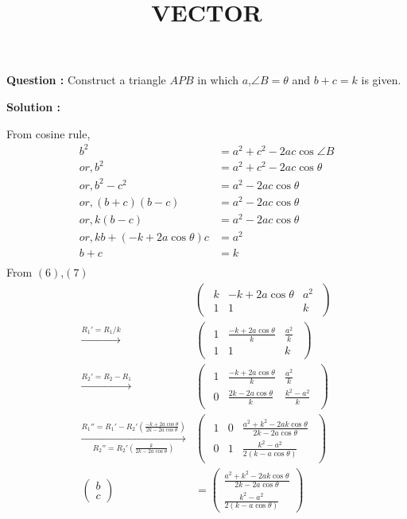 \documentclass[12pt]{article}
\providecommand{\brak}[1]{\ensuremath{\left(#1\right)}}
\begin{document}
\title{\textbf{VECTOR}}
\date{}
\maketitle
\textbf{Question :} Construct a triangle $APB$ in which $a$,$\angle B = \theta$ and $b+c= k$ is given.


\textbf{Solution :}

From cosine rule,
\begin{align}
  b^2&=a^2+c^2-2ac\cos{\angle B} \\
  or,b^2&=a^2+c^2-2ac\cos{\theta}\\
  or,b^2-c^2 &=a^2-2ac\cos{\theta}\\
  or,\brak{b+c}\brak{b-c}&=a^2-2ac\cos{\theta}\\
  or,k\brak{b-c}&=a^2-2ac\cos{\theta}\\
  or,kb+\brak{-k+2a\cos{\theta}}c&=a^2\\
  b+c&=k\\
\end{align}
From \brak{6},\brak{7} \\
\begin{align}
&\begin{pmatrix}
\begin{array}{cc|c}
k&-k+2a\cos{\theta}&a^2\\
1&1&k\end{array}
\end{pmatrix}\\
\xrightarrow{R_1'=R_1/k}&\begin{pmatrix}
\begin{array}{cc|c}
1&\frac{-k+2a\cos{\theta}}{k}&\frac{a^2}{k}\\
1&1&k\end{array}
\end{pmatrix}\\
 \xrightarrow{R_2'= R_2-R_1}&\begin{pmatrix}
\begin{array}{cc|c}
1&\frac{-k+2a\cos{\theta}}{k}&\frac{a^2}{k}\\
0&\frac{2k-2a\cos{\theta}}{k}&\frac{k^2-a^2}{k}\end{array}
\end{pmatrix}\\
  \xrightarrow[R_2''=R_2'\brak{\frac{k}{2k-2a\cos{\theta}}}]{R_1''= R_1'-R_2'\brak{\frac{-k+2a\cos{\theta}}{2k-2a\cos{\theta}}}}&\begin{pmatrix}
\begin{array}{cc|c}
1&0&\frac{a^2+k^2-2ak\cos{\theta}}{2k-2a\cos{\theta}}\\
0&1&\frac{k^2-a^2}{2\brak{k-a\cos{\theta}}}\end{array}
\end{pmatrix}\\
 \begin{pmatrix}
     b\\c
 \end{pmatrix}&=\begin{pmatrix}
   \frac{a^2+k^2-2ak\cos{\theta}}{2k-2a\cos{\theta}}\\\frac{k^2-a^2}{2\brak{k-a\cos{\theta}}}
 \end{pmatrix}
\end{align}
\end{document}
